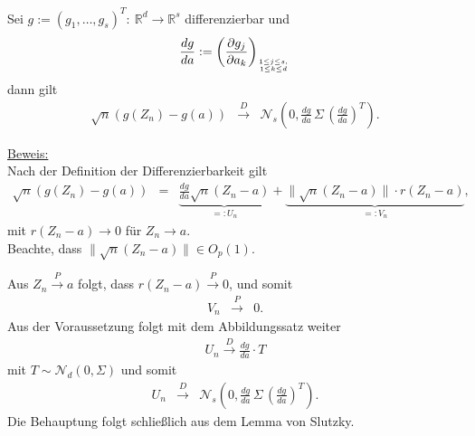 \documentclass[a4paper,11pt,twoside,titlepage]{article}
\newcommand{\R}{{\mathbb R}}
\newcommand\NN{ \mathcal{N} } %
\begin{document}
Sei $g:=(g_1,\ldots,g_s)^T:\ \R^d\rightarrow\R^s$ differenzierbar und
$$\frac{dg}{da}:=\left(\frac{\partial g_j}{\partial a_k}\right)_{1\leq j
\leq s, \atop 1\leq k \leq d}$$ dann gilt
\begin{eqnarray*}
\sqrt{n} \left(g(Z_n) - g(a)\right) &\stackrel{D}{\rightarrow}&
\NN_s\left(0,\frac{dg}{da} \, \Sigma \, \left(\frac{dg}{da}\right)^T\right).
\end{eqnarray*}

\underline{Beweis:}\\
Nach der Definition der Differenzierbarkeit gilt
\begin{eqnarray*}
 \sqrt{n} \left( g(Z_n)-g(a)\right) &=&
 \underbrace{\frac{dg}{da} \sqrt{n} (Z_n-a)}_{=:U_n} +
 \underbrace{\|\sqrt{n}(Z_n-a)\|\cdot r(Z_n-a)}_{=:V_n},
\end{eqnarray*}
mit $r(Z_n-a)\rightarrow 0$ für $Z_n \rightarrow a$.\\
Beachte, dass $\|\sqrt{n}(Z_n-a)\|\in O_p{(1)}$.

Aus $Z_n\stackrel{P}{\rightarrow}a$ folgt,
dass $r(Z_n-a)\stackrel{P}{\rightarrow}0$, und somit
\begin{eqnarray*}
V_n &\stackrel{P}{\rightarrow}& 0.
\end{eqnarray*}
Aus der Voraussetzung folgt mit dem Abbildungssatz weiter
\begin{eqnarray*}
U_n\stackrel{D}{\rightarrow}\frac{dg}{da}\cdot T
\end{eqnarray*}
mit $T\sim\NN_d(0,\Sigma)$ und somit
\begin{eqnarray*}
 U_n  &\stackrel{D}{\rightarrow}& \NN_s\left(0,\frac{dg}{da} \,
\Sigma \, \left(\frac{dg}{da}\right)^T\right).
\end{eqnarray*}
Die Behauptung folgt schlie{\ss}lich aus dem Lemma von Slutzky.

\end{document}
